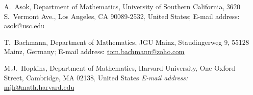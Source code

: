 \documentclass[11pt,leqno]{article}
\makeatletter
\renewcommand{\1}{{\rm 1\hspace*{-0.4ex}%
\rule{0.1ex}{1.52ex}\hspace*{0.2ex}}}
\newcommand{\<}[1]{{\langle}#1 {\rangle}}
\newcommand{\Addresses}{{%
\bigskip
\footnotesize

A.~Asok, Department of Mathematics, University of Southern California, 3620 S.~Vermont Ave., Los Angeles, CA 90089-2532, United States; E-mail address: \url{asok@usc.edu}
\medskip

T.~Bachmann, Department of Mathematics, JGU Mainz, Staudingerweg 9, 55128 Mainz, Germany; E-mail address: \url{tom.bachmann@zoho.com}
\medskip

M.J.~Hopkins, Department of Mathematics, Harvard University, One Oxford Street, Cambridge, MA 02138, United States \textit{E-mail address:} \url{mjh@math.harvard.edu}
}}
\theoremstyle{plain}
\theoremstyle{definition}
\theoremstyle{remark}
\numberwithin{equation}{subsection}
\makeatother
\begin{document}


















 
	
\begin{footnotesize}


\end{footnotesize}
\Addresses
\end{document}
